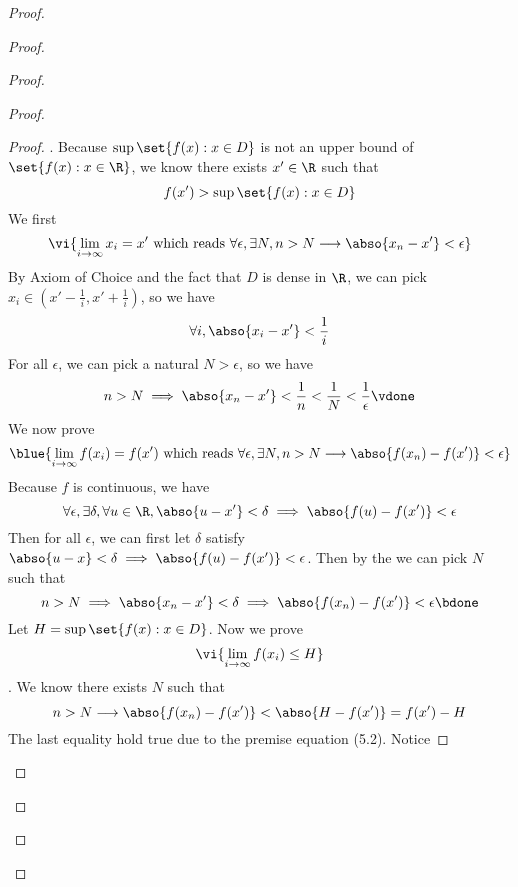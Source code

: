 \documentclass{report}
\begin{document}
\begin{proof}
\begin{proof}
\begin{proof}
\begin{proof}
\begin{proof}
. Because $\sup \set{f(x):x\in D}$ is not an upper bound of $\set{f(x):x\in \R}$, we know there exists $x'\in \R$ such that 
\begin{equation*}
f(x')>\sup \set{f(x):x\in D}
\end{equation*}
We first  
\begin{equation*}
  \vi{\lim_{i\to \infty}x_i=x'\text{ which reads } \forall \epsilon, \exists N, n>N \longrightarrow \abso{x_n - x'}<\epsilon}
\end{equation*}
By Axiom of Choice and the fact that $D$ is dense in  $\R$, we can pick $x_i \in (x'- \frac{1}{i},x' +\frac{1}{i})$, so we have
\begin{equation*}
\forall i, \abso{x_i-x'}<\frac{1}{i}
\end{equation*}
For all $\epsilon $, we can pick a natural $N>\epsilon $, so we have 
\begin{equation*}
n>N\implies \abso{x_n-x'}<\frac{1}{n}<\frac{1}{N}<\frac{1}{\epsilon }\vdone
\end{equation*}
We now prove 
\begin{equation*}
\blue{\lim_{i\to\infty}f(x_i)=f(x')\text{ which reads }\forall \epsilon , \exists N, n>N\longrightarrow  \abso{f(x_n)-f(x')}<\epsilon }
\end{equation*}
Because $f$ is continuous, we have 
\begin{equation*}
  \forall \epsilon ,\exists \delta, \forall u\in \R, \abso{u-x'}<\delta\implies \abso{f(u)-f(x')}<\epsilon  
\end{equation*}
Then for all $\epsilon $, we can first let $\delta$ satisfy $\abso{u-x}<\delta \implies \abso{f(u)-f(x')}<\epsilon $. Then by the  we can pick $N$ such that 
\begin{equation*}
n>N\implies \abso{x_n - x'}< \delta \implies \abso{f(x_n)-f(x')}<\epsilon \bdone 
\end{equation*}
Let $H=\sup \set{f(x): x\in D}$. Now we prove  
\begin{equation*}
  \vi{\lim_{i \to \infty}f(x_i)\leq H}
\end{equation*}
. We know there exists $N$ such that 
\begin{equation*}
n>N\longrightarrow \abso{f(x_n)-f(x')}<\abso{H - f(x') }=f(x')-H
\end{equation*}
The last equality hold true due to the premise equation (5.2). Notice 

\end{proof}
\end{proof}
\end{proof}
\end{proof}
\end{proof}
\end{document}
